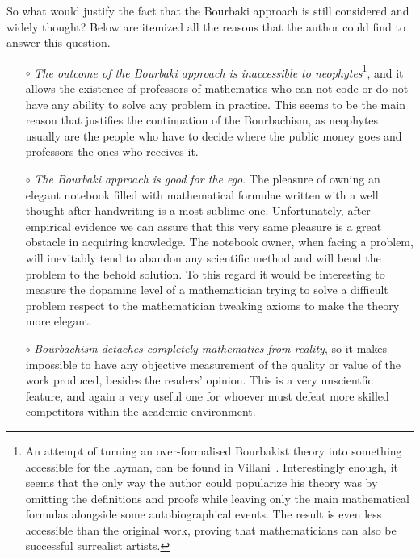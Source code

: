 \documentclass[]{scrartcl}
\theoremstyle{definition}
\begin{document}
So what would justify the fact that the Bourbaki approach is still considered and widely thought? Below are itemized all the reasons that the author could find to answer this question.

\begin{itemize}
    \item[$\circ$] \emph{The outcome of the Bourbaki approach is inaccessible to neophytes}\footnote{
        An attempt of turning an over-formalised Bourbakist theory into something accessible for the layman, can be found in Villani~\cite{villani2003livingtheorem}. Interestingly enough, it seems that the only way the author could popularize his theory was by omitting the definitions and proofs while leaving only the main mathematical formulas alongside some autobiographical events. The result is even less accessible than the original work, proving that mathematicians can also be successful surrealist artists.
    }, and it allows the existence of professors of mathematics who can not code or do not have any ability to solve any problem in practice. This seems to be the main reason that justifies the continuation of the Bourbachism, as neophytes usually are the people who have to decide where the public money goes and professors the ones who receives it.
    
    \item[$\circ$] \emph{The Bourbaki approach is good for the ego}. The pleasure of owning an elegant notebook filled with mathematical formulae written with a well thought after handwriting is a most sublime one. Unfortunately, after empirical evidence we can assure that this very same pleasure is a great obstacle in acquiring knowledge. The notebook owner, when facing a problem, will inevitably tend to abandon any scientific method and will bend the problem to the behold solution. To this regard it would be interesting to measure the dopamine level of a mathematician trying to solve a difficult problem respect to the mathematician tweaking axioms to make the theory more elegant.
    
    \item[$\circ$] \emph{Bourbachism detaches completely mathematics from reality}, so it makes impossible to have any objective measurement of the quality or value of the work produced, besides the readers' opinion. This is a very unscientfic feature, and again a very useful one for whoever must defeat  more skilled competitors within the academic environment.
    

\end{itemize}
\end{document}

